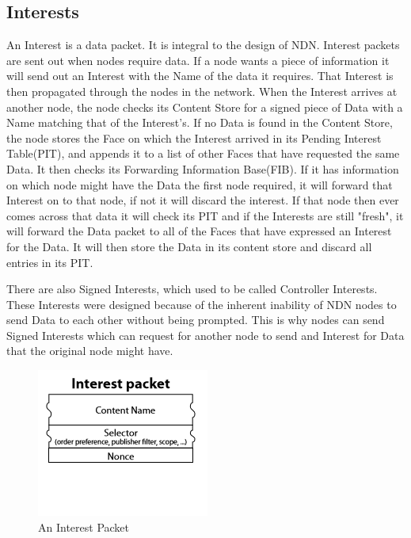 \subsection{Interests}
An Interest is a data packet. It is integral to the design of NDN. Interest packets are sent out when nodes require data. If a node wants a piece of information it will send out an Interest with the Name of the data it requires. That Interest is then propagated through the nodes in the network. When the Interest arrives at another node, the node checks its Content Store for a signed piece of Data with a Name matching that of the Interest's. If no Data is found in the Content Store, the node stores the Face on which the Interest arrived in its Pending Interest Table(PIT), and appends it to a list of other Faces that have requested the same Data. It then checks its Forwarding Information Base(FIB). If it has information on which node might have the Data the first node required, it will forward that Interest on to that node, if not it will discard the interest. If that node then ever comes across that data it will check its PIT and if the Interests are still "fresh", it will forward the Data packet to all of the Faces that have expressed an Interest for the Data. It will then store the Data in its content store and discard all entries in its PIT. \par 
There are also Signed Interests, which used to be called Controller Interests. These Interests were designed because of the inherent inability of NDN nodes to send Data to each other without being prompted. This is why nodes can send Signed Interests which can request for another node to send and Interest for Data that the original node might have.
\begin{figure}[h]
\centering
\includegraphics{interestpacket.png}
\caption{An Interest Packet\cite{027}}
\end{figure}
